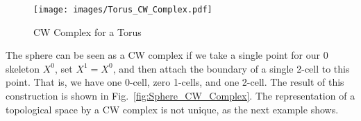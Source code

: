 \documentclass{book}                                                           %
\begin{document}
            \begin{figure}
                \centering
                \captionsetup{type=figure}
                \texttt{[image: images/Torus\_CW\_Complex.pdf]}
                \caption{CW Complex for a Torus}
                \label{fig:CW_Complex_Torus}
            \end{figure}
            \begin{minipage}[t]{0.52\textwidth}
                \begin{example}
                    The sphere can be seen as a CW complex if we take a single
                    point for our 0 skeleton $X^{0}$, set $X^{1}=X^{0}$, and
                    then attach the boundary of a single 2-cell to this point.
                    That is, we have one 0-cell, zero 1-cells, and one 2-cell.
                    The result of this construction is shown in
                    Fig.~\ref{fig:Sphere_CW_Complex}. The representation of a
                    topological space by a CW complex is not unique, as the
                    next example shows.
                \end{example}
            \end{minipage}
            \hfill
            \par\vspace{2.5ex}
\end{document}
